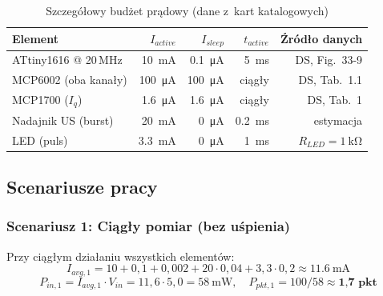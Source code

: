 \documentclass[a4paper,11pt]{article}
\begin{document}
\begin{table}[H]
    \centering
    \caption{Szczegółowy budżet prądowy (dane z~kart katalogowych)}
    \label{tab:moc_detail}
    \begin{tabular}{lrrrr}
        \toprule
        \textbf{Element} & \textbf{$I_{active}$} & \textbf{$I_{sleep}$}
            & \textbf{$t_{active}$} & \textbf{Źródło danych} \\
        \midrule
        ATtiny1616 @ 20\,MHz
            & \SI{10}{\milli\ampere}
            & \SI{0,1}{\micro\ampere}
            & \SI{5}{\milli\second}
            & DS, Fig.~33-9 \\
        MCP6002 (oba kanały)
            & \SI{100}{\micro\ampere}
            & \SI{100}{\micro\ampere}
            & ciągły
            & DS, Tab.~1.1 \\
        MCP1700 ($I_q$)
            & \SI{1,6}{\micro\ampere}
            & \SI{1,6}{\micro\ampere}
            & ciągły
            & DS, Tab.~1 \\
        Nadajnik US (burst)
            & \SI{20}{\milli\ampere}
            & \SI{0}{\micro\ampere}
            & \SI{0,2}{\milli\second}
            & estymacja \\
        LED (puls)
            & \SI{3,3}{\milli\ampere}
            & \SI{0}{\micro\ampere}
            & \SI{1}{\milli\second}
            & $R_{LED} = \SI{1}{\kilo\ohm}$ \\
        \bottomrule
    \end{tabular}
\end{table}

\subsection{Scenariusze pracy}

\subsubsection{Scenariusz 1: Ciągły pomiar (bez uśpienia)}

Przy ciągłym działaniu wszystkich elementów:
\begin{equation}
    I_{avg,1} = 10 + 0{,}1 + 0{,}002 + 20 \cdot 0{,}04 + 3{,}3 \cdot 0{,}2 \approx \SI{11,6}{\milli\ampere}
\end{equation}
\begin{equation}
    P_{in,1} = I_{avg,1} \cdot V_{in} = 11{,}6 \cdot 5{,}0 = \SI{58}{\milli\watt}, \quad
    P_{pkt,1} = 100/58 \approx \textbf{1,7~pkt}
\end{equation}
\end{document}
